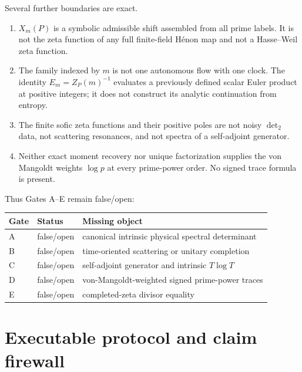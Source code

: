 \documentclass[11pt]{article}
\numberwithin{equation}{section}
\theoremstyle{remark}
\begin{document}
Several further boundaries are exact.
\begin{enumerate}
\item $X_m(P)$ is a symbolic admissible shift assembled from all prime
labels.  It is not the zeta function of any full finite-field H\'enon map and
not a Hasse--Weil zeta function.
\item The family indexed by $m$ is not one autonomous flow with one clock.
The identity $E_m=Z_P(m)^{-1}$ evaluates a previously defined scalar Euler
product at positive integers; it does not construct its analytic
continuation from entropy.
\item The finite sofic zeta functions and their positive poles are not noisy
$\det_2$ data, not scattering resonances, and not spectra of a
self-adjoint generator.
\item Neither exact moment recovery nor unique factorization supplies the
von Mangoldt weights $\log p$ at every prime-power order.  No signed trace
formula is present.
\end{enumerate}

Thus Gates A--E remain false/open:
\begin{center}
\begin{tabular}{lll}
\toprule
Gate & Status & Missing object \\
\midrule
A & false/open & canonical intrinsic physical spectral determinant \\
B & false/open & time-oriented scattering or unitary completion \\
C & false/open & self-adjoint generator and intrinsic $T\log T$ \\
D & false/open & von-Mangoldt-weighted signed prime-power traces \\
E & false/open & completed-zeta divisor equality \\
\bottomrule
\end{tabular}
\end{center}

\section{Executable protocol and claim firewall}
\end{document}
